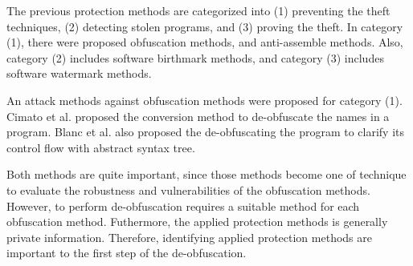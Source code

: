 \documentclass[conference]{IEEEtran}
\begin{document}
The previous protection methods are categorized into (1) preventing
the theft techniques, (2) detecting stolen programs, and (3) proving
the theft\cite{collberg09surreptitious}.
%
In category (1), there were proposed obfuscation methods, and
anti-assemble methods\cite{tyma00patent,monden97ieice}.  Also,
category (2) includes software birthmark
methods\cite{tamada05ieice}, and category (3) includes software
watermark methods\cite{collberg99popl}.

An attack methods against obfuscation methods were proposed for
category (1)\cite{cimato05jss}.
%
Cimato et al. proposed the conversion method to de-obfuscate the names
in a program.
%
Blanc et al. also proposed the de-obfuscating the program to clarify
its control flow with abstract syntax tree\cite{blanc12waina}.

Both methods are quite important, since those methods become one of
technique to evaluate the robustness and vulnerabilities of the
obfuscation methods.  However, to perform de-obfuscation requires a
suitable method for each obfuscation method.  Futhermore, the applied
protection methods is generally private information.  Therefore,
identifying applied protection methods are important to the first step
of the de-obfuscation.

% 
\end{document}
